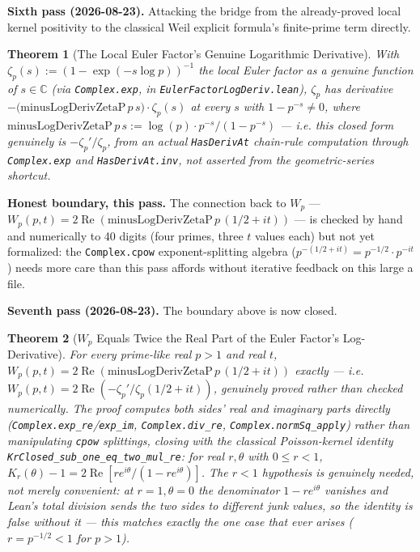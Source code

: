 \documentclass{report}
\newtheorem{theorem}{Theorem}[chapter]
\theoremstyle{definition}
\begin{document}
\textbf{Sixth pass (2026-08-23).} Attacking the bridge from the already-proved local
kernel positivity to the classical Weil explicit formula's finite-prime term directly.

\begin{theorem}[The Local Euler Factor's Genuine Logarithmic Derivative]
  \label{thm:hasderivat-zetap}
  \leanok
  With $\zeta_p(s):=(1-\exp(-s\log p))^{-1}$ the local Euler factor as a genuine function
  of $s\in\mathbb{C}$ (via \texttt{Complex.exp}, in \texttt{EulerFactorLogDeriv.lean}),
  $\zeta_p$ has derivative $-\bigl(\text{minusLogDerivZetaP}\,p\,s\bigr)\cdot\zeta_p(s)$ at
  every $s$ with $1-p^{-s}\ne0$, where $\text{minusLogDerivZetaP}\,p\,s:=\log(p)\cdot
  p^{-s}/(1-p^{-s})$ --- i.e. this closed form genuinely \emph{is} $-\zeta_p'/\zeta_p$,
  from an actual \texttt{HasDerivAt} chain-rule computation through \texttt{Complex.exp}
  and \texttt{HasDerivAt.inv}, not asserted from the geometric-series shortcut.
\end{theorem}

\textbf{Honest boundary, this pass.} The connection back to $W_p$ --- $W_p(p,t) =
2\operatorname{Re}(\text{minusLogDerivZetaP}\,p\,(1/2+it))$ --- is checked by hand and
numerically to 40 digits (four primes, three $t$ values each) but not yet formalized:
the \texttt{Complex.cpow} exponent-splitting algebra ($p^{-(1/2+it)}=p^{-1/2}\cdot p^{-it}$)
needs more care than this pass affords without iterative feedback on this large a file.

\textbf{Seventh pass (2026-08-23).} The boundary above is now closed.

\begin{theorem}[$W_p$ Equals Twice the Real Part of the Euler Factor's Log-Derivative]
  \label{thm:wp-eq-two-mul-re-minuslogderivzetap}
  \leanok
  For every prime-like real $p>1$ and real $t$, $W_p(p,t) =
  2\operatorname{Re}(\text{minusLogDerivZetaP}\,p\,(1/2+it))$ exactly --- i.e.
  $W_p(p,t)=2\operatorname{Re}(-\zeta_p'/\zeta_p(1/2+it))$, genuinely proved rather than
  checked numerically. The proof computes both sides' real and imaginary parts directly
  (\texttt{Complex.exp\_re}/\texttt{exp\_im}, \texttt{Complex.div\_re},
  \texttt{Complex.normSq\_apply}) rather than manipulating \texttt{cpow} splittings, closing
  with the classical Poisson-kernel identity
  \texttt{KrClosed\_sub\_one\_eq\_two\_mul\_re}: for real $r,\theta$ with $0\le r<1$,
  $K_r(\theta)-1 = 2\operatorname{Re}[re^{i\theta}/(1-re^{i\theta})]$. The $r<1$ hypothesis is
  genuinely needed, not merely convenient: at $r=1,\theta=0$ the denominator $1-re^{i\theta}$
  vanishes and Lean's total division sends the two sides to different junk values, so the
  identity is false without it --- this matches exactly the one case that ever arises
  ($r=p^{-1/2}<1$ for $p>1$).
\end{theorem}
\end{document}
